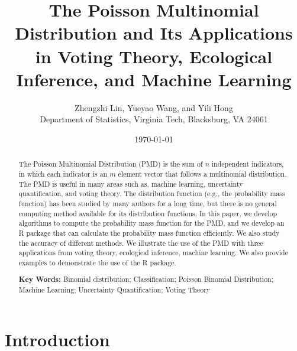\documentclass[12pt]{article}
\begin{document}


\title{The Poisson Multinomial Distribution and Its Applications in Voting Theory, Ecological Inference, and Machine Learning}


\author{
Zhengzhi Lin, Yueyao Wang, and Yili Hong\\[1.5ex]
{Department of Statistics, Virginia Tech, Blacksburg, VA 24061}
}
	
\date{\today}
	
\maketitle
\begin{abstract}
The Poisson Multinomial Distribution (PMD) is the sum of $n$ independent indicators, in which each indicator is an $m$ element vector that follows a multinomial distribution. The PMD is useful in many areas such as, machine learning, uncertainty quantification, and voting theory. The distribution function (e.g., the probability mass function) has been studied by many authors for a long time, but there is no general computing method available for its distribution functions. In this paper, we develop algorithms to compute the probability mass function for the PMD, and we develop an R package that can calculate the probability mass function efficiently. We also study the accuracy of different methods. We illustrate the use of the PMD with three applications from voting theory, ecological inference, machine learning. We also provide examples to demonstrate the use of the R package.
		
\textbf{Key Words:} Binomial distribution; Classification; Poisson Binomial Distribution; Machine Learning; Uncertainty Quantification;  Voting Theory
\end{abstract}
	
\newpage
\tableofcontents
\newpage
	
\section{Introduction}
\end{document}

